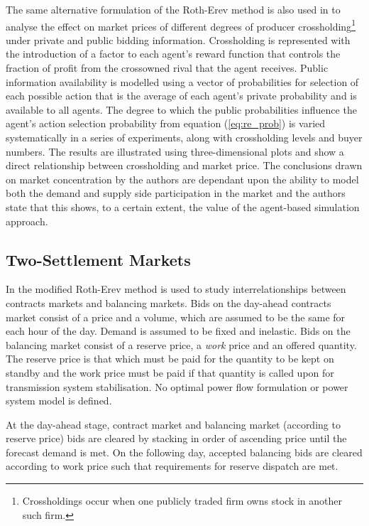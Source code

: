 The same alternative formulation of the Roth-Erev method is also used in
 to analyse the effect on market prices of different degrees
of producer crossholding\footnote{Crossholdings occur when one publicly
traded firm owns stock in another such firm.} under private and public bidding
information.  Crossholding is represented with the introduction of a factor
to each agent's reward function that controls the fraction of profit from
the crossowned rival that the agent receives.  Public information availability
is modelled using a vector of probabilities for selection of each
possible action that is the average of each agent's private probability and is
available to all agents. The degree to which the public probabilities
influence the agent's action selection probability from equation (\ref{eq:re_prob}) is varied
systematically in a series of experiments, along with crossholding levels and
buyer numbers.  The results are illustrated using three-dimensional
plots and show a direct relationship between crossholding and market price.
The conclusions drawn on market concentration by the authors are dependant upon
the ability to model both the demand and supply side participation in the
market and the authors state that this shows, to a certain extent, the value
of the agent-based simulation approach.

\subsection{Two-Settlement Markets}
In  the modified Roth-Erev method is used to study
interrelationships between contracts markets and balancing markets.  Bids on the
day-ahead contracts market consist of a price and a volume, which are assumed to
be the same for each hour of the day.  Demand is assumed to be fixed and
inelastic.  Bids on the balancing market consist of a reserve price, a
\textit{work} price and an offered quantity.  The reserve price is that which
must be paid for the quantity to be kept on standby and the work price must be
paid if that quantity is called upon for transmission system stabilisation. No
optimal power flow formulation or power system model is defined.

At the day-ahead stage, contract market and balancing market (according to
reserve price) bids are cleared by stacking in order of ascending price until the
forecast demand is met.  On the following day, accepted balancing bids are
cleared according to work price such that requirements for reserve dispatch
are met.

